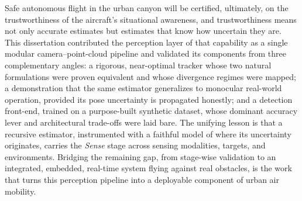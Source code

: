 Safe autonomous flight in the urban canyon will be certified, ultimately, on the
trustworthiness of the aircraft's situational awareness, and trustworthiness
means not only accurate estimates but estimates that know how uncertain they are.
This dissertation contributed the perception layer of that capability as a single
modular camera--point-cloud pipeline and validated its components from three
complementary angles: a rigorous, near-optimal tracker whose two natural
formulations were proven equivalent and whose divergence regimes were mapped; a
demonstration that the same estimator generalizes to monocular real-world
operation, provided its pose uncertainty is propagated honestly; and a detection
front-end, trained on a purpose-built synthetic dataset, whose dominant
accuracy lever and architectural trade-offs were laid bare. The unifying lesson
is that a recursive estimator, instrumented with a faithful model of where its
uncertainty originates, carries the \emph{Sense} stage across sensing
modalities, targets, and environments. Bridging the remaining gap, from
stage-wise validation to an integrated, embedded, real-time system flying against
real obstacles, is the work that turns this perception pipeline into a deployable
component of urban air mobility.
